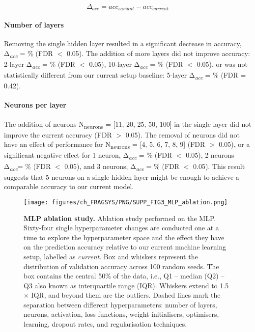 \begin{equation}
\Delta_{acc} = acc_{variant} - acc_{current}
\label{eq:delta_accuracy}
\end{equation}
\vspace{-37pt} %

\paragraph{Number of layers}

Removing the single hidden layer resulted in a significant decrease in accuracy, Δ\textsubscript{\textit{acc}} = \% (FDR $<$ 0.05). The addition of more layers did not improve accuracy: 2-layer Δ\textsubscript{\textit{acc}} = \% (FDR $<$ 0.05), 10-layer Δ\textsubscript{\textit{acc}} = \% (FDR $<$ 0.05), or was not statistically different from our current setup baseline: 5-layer Δ\textsubscript{\textit{acc}} = \% (FDR = 0.42).

\paragraph{Neurons per layer}

The addition of neurons N\textsubscript{neurons} = [11, 20, 25, 50, 100] in the single layer did not improve the current accuracy (FDR $>$ 0.05). The removal of neurons did not have an effect of performance for N\textsubscript{neurons} = [4, 5, 6, 7, 8, 9] (FDR $>$ 0.05), or a significant negative effect for 1 neuron, Δ\textsubscript{\textit{acc}} = \% (FDR $<$ 0.05), 2 neurons Δ\textsubscript{\textit{acc}}= \% (FDR $<$ 0.05), and 3 neurons, Δ\textsubscript{\textit{acc}} = \% (FDR $<$ 0.05). This result suggests that 5 neurons on a single hidden layer might be enough to achieve a comparable accuracy to our current model.

\begin{figure}[ht!]
    \centering
    \texttt{[image: figures/ch\_FRAGSYS/PNG/SUPP\_FIG3\_MLP\_ablation.png]}
    \caption[MLP ablation study]{\textbf{MLP ablation study.} Ablation study performed on the MLP. Sixty-four single hyperparameter changes are conducted one at a time to explore the hyperparameter space and the effect they have on the prediction accuracy relative to our current machine learning setup, labelled as \textit{current}. Box and whiskers represent the distribution of validation accuracy across 100 random seeds. The box contains the central 50\% of the data, i.e., Q1 – median (Q2) – Q3  also known as interquartile range (IQR). Whiskers extend to 1.5 $\times$ IQR, and beyond them are the outliers. Dashed lines mark the separation between different hyperparameters: number of layers, neurons, activation, loss functions, weight initialisers, optimisers, learning, dropout rates, and regularisation techniques.}
    \label{fig:mlp_ablation}
\end{figure}

